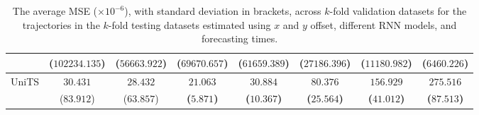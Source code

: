 \begin{table}[!ht]
{\begin{tabular}{|c|c|c|c|c|c|c|c|}
			 & ($102234.135$) & ($56663.922$) & ($69670.657$) & ($61659.389$) & ($27186.396$) & ($11180.982$) & ($6460.226$) \\ \hline
			\multirow{2}{*}{UniTS} & $30.431$ & $28.432$ & $\mathbf{21.063}$ & $\mathbf{30.884}$ & $\mathbf{80.376}$ & $\mathbf{156.929}$ & $\mathbf{275.516}$ \\
			 & ($83.912$) & ($63.857$) & \textbf{(}$\mathbf{5.871}$\textbf{)} & \textbf{(}$\mathbf{10.367}$\textbf{)} & \textbf{(}$\mathbf{25.564}$\textbf{)} & \textbf{(}$\mathbf{41.012}$\textbf{)} & \textbf{(}$\mathbf{87.513}$\textbf{)} \\ \hline
		\end{tabular}
	}
	\caption{The average MSE ($\times 10^{-6}$), with standard deviation in brackets, across $k$-fold validation datasets for the trajectories in the $k$-fold testing datasets estimated using $x$ and $y$ offset, different RNN models, and forecasting times.}
	\label{tab:all_no_abs_MSE}
\end{table}

